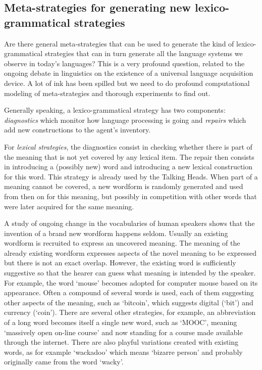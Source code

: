 \subsection{Meta-strategies for generating new lexico-grammatical strategies}

Are there general meta-strategies that can be used to generate the kind of lexico-grammatical strategies 
that can in turn generate all the language systems we observe 
in today's languages? This is a very profound question, related to the ongoing debate in linguistics on the existence of 
a universal language acquisition device. A lot of ink has been spilled but we need to do profound computational modeling 
of meta-strategies and thorough experiments to find out. 

Generally speaking, a lexico-grammatical strategy has two components: {\itshape diagnostics} which monitor how 
language processing is going and {\itshape repairs} which add new 
constructions to the agent's inventory. 

For {\itshape lexical strategies}, the diagnostics consist in checking whether there is part 
of the meaning that is not yet covered by any lexical item. The repair then consists in introducing 
a (possibly new) word and introducing a new lexical construction for this word. 
This strategy is already used by the Talking Heads. When part of a meaning cannot be covered, a new wordform is randomly generated
and used from then on for this meaning, but possibly in competition with other words that were later acquired for the same 
meaning. 

A study of ongoing change in the vocabularies of human speakers shows that the invention of a brand new wordform happens seldom. 
Usually an existing wordform is recruited to express an uncovered meaning. The meaning of the already existing wordform
expresses aspects of the novel meaning to be expressed but there is not an exact overlap. However, the existing word is sufficiently 
suggestive so that the hearer can guess what meaning is intended by the speaker. For example, the word `mouse' becomes 
adopted for computer mouse based on its appearance. Often a compound of several words is used, each of them suggesting 
other aspects of the meaning, such as `bitcoin', which suggests digital (`bit') and currency (`coin').  
There are several other strategies, for example, an abbreviation of a long word becomes itself a single new word, 
such as `MOOC', meaning `massively open on-line course' and now standing for a course made available through the internet. 
There are also playful variations created with existing words, as for example
`wackadoo' which means `bizarre person' and probably originally came from the word `wacky'. 

